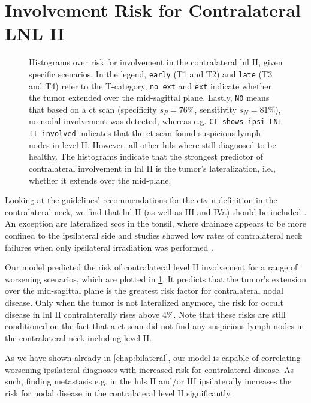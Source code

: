 \documentclass[\relativeRoot/main.tex]{subfiles}
\begin{document}
\section{Involvement Risk for Contralateral LNL II}
\label{sec:complete:contraII}

\begin{figure}
    \centering
    \def\svgwidth{1.0\textwidth}
    
    \caption[
        Complete model's risk predictions for contralateral LNL II
    ]{
        Histograms over risk for involvement in the contralateral \gls{lnl} II, given specific scenarios. In the legend, \texttt{early} (T1 and T2) and \texttt{late} (T3 and T4) refer to the T-category, \texttt{no ext} and \texttt{ext} indicate whether the tumor extended over the mid-sagittal plane. Lastly, \texttt{N0} means that based on a \gls{ct} scan (specificity $s_P = 76\%$, sensitivity $s_N = 81\%$), no nodal involvement was detected, whereas e.g. \texttt{CT shows ipsi LNL II involved} indicates that the \gls{ct} scan found suspicious lymph nodes in level II. However, all other \glspl{lnl} where still diagnosed to be healthy. The histograms indicate that the strongest predictor of contralateral involvement in \gls{lnl} II is the tumor's lateralization, i.e., whether it extends over the mid-plane.
    }
    \label{fig:complete:contraII}
\end{figure}

Looking at the guidelines' recommendations for the \gls{ctv-n} definition in the contralateral neck, we find that \gls{lnl} II (as well as III and IVa) should be included \cite{biau_selection_2019}. An exception are lateralized \glspl{scc} in the tonsil, where drainage appears to be more confined to the ipsilateral side and studies showed low rates of contralateral neck failures when only ipsilateral irradiation was performed \cite{huang_re-evaluation_2017}.

Our model predicted the risk of contralateral level II involvement for a range of worsening scenarios, which are plotted in \cref{fig:complete:contraII}. It predicts that the tumor's extension over the mid-sagittal plane is the greatest risk factor for contralateral nodal disease. Only when the tumor is not lateralized anymore, the risk for occult disease in \gls{lnl} II contralaterally rises above 4\%. Note that these risks are still conditioned on the fact that a \gls{ct} scan did not find any suspicious lymph nodes in the contralateral neck including level II.

As we have shown already in \cref{chap:bilateral}, our model is capable of correlating worsening ipsilateral diagnoses with increased risk for contralateral disease. As such, finding metastasis e.g. in the \glspl{lnl} II and/or III ipsilaterally increases the risk for nodal disease in the contralateral level II significantly.
\end{document}

